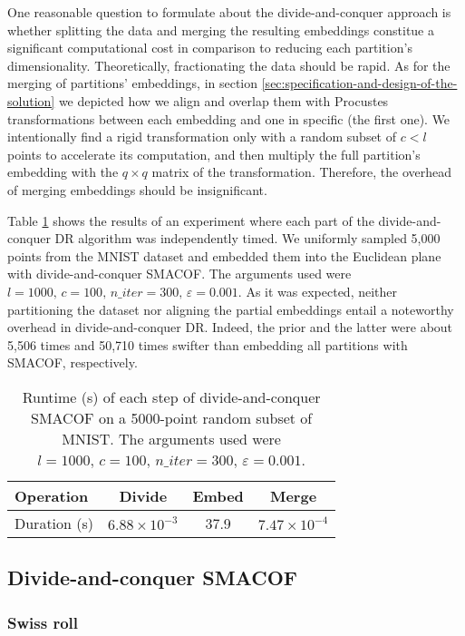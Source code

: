 One reasonable question to formulate about the divide-and-conquer approach is whether splitting the data and merging the resulting embeddings constitue a significant computational cost in comparison to reducing each partition's dimensionality. Theoretically, fractionating the data should be rapid. As for the merging of partitions' embeddings, in section \ref{sec:specification-and-design-of-the-solution} we depicted how we align and overlap them with Procustes transformations between each embedding and one in specific (the first one). We intentionally find a rigid transformation only with a random subset of $c < l$ points to accelerate its computation, and then multiply the full partition's embedding with the $q\times q$ matrix of the transformation. Therefore, the overhead of merging embeddings should be insignificant.

Table \ref{tab:dc-overhead} shows the results of an experiment where each part of the divide-and-conquer DR algorithm was independently timed. We uniformly sampled 5,000 points from the MNIST dataset and embedded them into the Euclidean plane with divide-and-conquer SMACOF. The arguments used were $l=1000,\, c=100,\, n\_iter = 300,\, \varepsilon = 0.001$. As it was expected, neither partitioning the dataset nor aligning the partial embeddings entail a noteworthy overhead in divide-and-conquer DR. Indeed, the prior and the latter were about 5,506 times and 50,710 times swifter than embedding all partitions with SMACOF, respectively.

\begin{table}[ht]
    \centering
    \begin{tabular}{lccc}
        \toprule
        Operation    & Divide & Embed & Merge \\
        \midrule
        Duration (s) & $6.88 \times 10^{-3}$ & 37.9 & $7.47 \times 10^{-4}$ \\
        \bottomrule
    \end{tabular}
    \caption{Runtime (s) of each step of divide-and-conquer SMACOF on a 5000-point random subset of MNIST. The arguments used were $l=1000,\, c=100,\, n\_iter = 300,\, \varepsilon = 0.001$.}
    \label{tab:dc-overhead}
\end{table}

\subsection{Divide-and-conquer SMACOF}

\subsubsection{Swiss roll}

